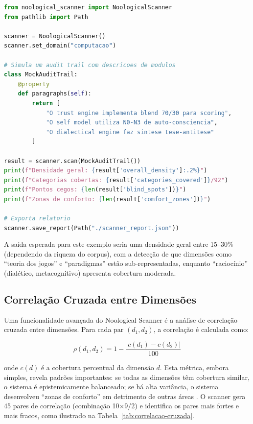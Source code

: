 \begin{lstlisting}[caption={Exemplo de varredura noologica do ecossistema.},
label={cod:noological-example}, style=pythonstyle, language=Python]
from noological_scanner import NoologicalScanner
from pathlib import Path

scanner = NoologicalScanner()
scanner.set_domain("computacao")

# Simula um audit trail com descricoes de modulos
class MockAuditTrail:
    @property
    def paragraphs(self):
        return [
            "O trust engine implementa blend 70/30 para scoring",
            "O self model utiliza N0-N3 de auto-consciencia",
            "O dialectical engine faz sintese tese-antitese"
        ]

result = scanner.scan(MockAuditTrail())
print(f"Densidade geral: {result['overall_density']:.2%}")
print(f"Categorias cobertas: {result['categories_covered']}/92")
print(f"Pontos cegos: {len(result['blind_spots'])}")
print(f"Zonas de conforto: {len(result['comfort_zones'])}")

# Exporta relatorio
scanner.save_report(Path("./scanner_report.json"))
\end{lstlisting}

A saída esperada para este exemplo seria uma densidade geral entre 15--30\%
(dependendo da riqueza do corpus), com a detecção de que dimensões como
``teoria dos jogos'' e ``paradigmas'' estão sub-representadas, enquanto
``raciocínio'' (dialético, metacognitivo) apresenta cobertura moderada.

\subsection{Correlação Cruzada entre Dimensões}

Uma funcionalidade avançada do Noological Scanner é a análise de correlação
cruzada entre dimensões. Para cada par $(d_1, d_2)$, a correlação é calculada
como:

\begin{equation}
\rho(d_1, d_2) = 1 - \frac{|c(d_1) - c(d_2)|}{100}
\end{equation}

onde $c(d)$ é a cobertura percentual da dimensão $d$. Esta métrica, embora
simples, revela padrões importantes: se todas as dimensões têm cobertura
similar, o sistema é epistemicamente balanceado; se há alta variância, o
sistema desenvolveu ``zonas de conforto'' em detrimento de outras áreas
\cite{box1976science, kahneman2003perspective}. O scanner gera 45 pares de
correlação (combinação 10×9/2) e identifica os pares mais fortes e mais
fracos, como ilustrado na Tabela~\ref{tab:correlacao-cruzada}.

